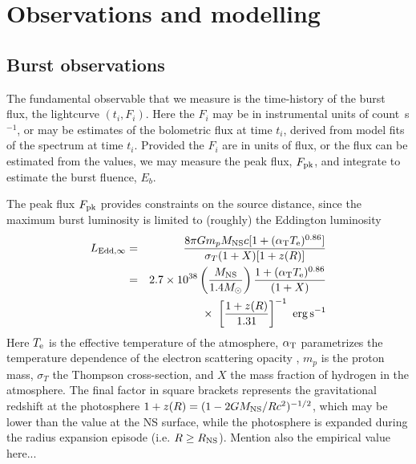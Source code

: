 \documentclass{aastex61}
\newcommand\latex{La\TeX}
\newcommand{\eps}{{\rm erg\,s^{-1}}}
\begin{document}

\section{Observations and modelling} 
\label{sec:data}

\subsection{Burst observations}
\label{subsec:data}

The fundamental observable that we measure is the time-history of the burst flux, the lightcurve $(t_i,F_{i})$. Here the $F_{i}$ may be in instrumental units of count~s$^{-1}$, or may be estimates of the bolometric flux at time $t_i$, derived from model fits of the spectrum at time $t_i$.
%
Provided the $F_i$ are in units of flux, or the flux can be estimated from the values,  we may measure the peak flux, $F_{\rm pk}$, and integrate to estimate the burst fluence, $E_b$. 

The peak flux $F_{\rm pk}$ provides constraints on the source distance, since the maximum burst luminosity is limited to (roughly) the Eddington luminosity \cite[e.g.][]{lew93}
\begin{eqnarray}
  L_{\rm Edd,\infty} & = & \frac{8\pi G m_p M_{\rm NS} c
  [1+(\alpha_{\rm T}T_{\rm e})^{0.86}]} {\sigma_T(1+X)[1+z(R)]} %
       \nonumber \\
  & = & 2.7\times10^{38} \left(\frac{M_{\rm NS}}{1.4M_\odot}\right)
 \frac{1+(\alpha_{\rm T}T_{\rm e})^{0.86}}{(1+X)}
\nonumber \\ & & \times\  %
    \left[\frac{1+z(R)}{1.31}\right]^{-1}\ %
              \eps
  \label{ledd}
\end{eqnarray}
Here
$T_{\rm e}$ is the
effective temperature of the atmosphere, $\alpha_{\rm T}$ parametrizes the temperature dependence of the electron scattering
opacity \cite[$\simeq 2.2\times10^{-9}$~K$^{-1}$;][]{lew93},
$m_p$ is the proton mass, $\sigma_T$ the Thompson 
cross-section, and $X$ the
mass fraction of hydrogen in the atmosphere.
The final factor in
square brackets represents the gravitational redshift 
at the photosphere $1+z(R)=(1-2GM_{\rm NS}/R
c^2)^{-1/2}$, which may be lower than the value at the NS surface, while the photosphere is expanded during the radius expansion episode (i.e. $R\ge R_{\rm NS}$).
%
Mention also the empirical value here...
\end{document}
